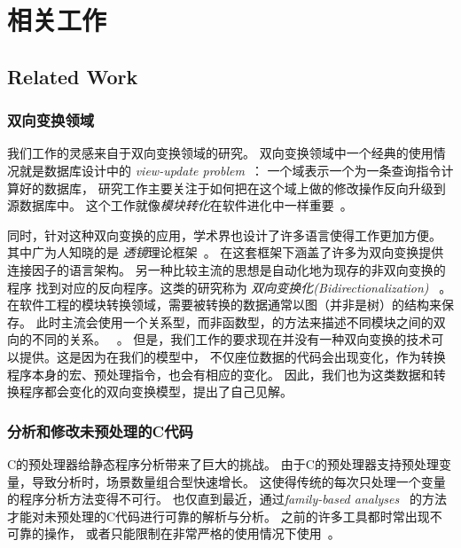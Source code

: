 \chapter{相关工作}
\section{Related Work}
\label{sec:related}

\subsection{双向变换领域}
我们工作的灵感来自于双向变换领域的研究。
双向变换领域中一个经典的使用情况就是数据库设计中的
\emph{view-update problem}~\parencite{BaSp81,DaBe82,Hegner90,Cui2000,Fegaras2010}：
一个域表示一个为一条查询指令计算好的数据库，
研究工作主要关注于如何把在这个域上做的修改操作反向升级到源数据库中。
这个工作就像\emph{模块转化}在软件进化中一样重要~\parencite{YuLHHKM12,XiLHZTM07}。

同时，针对这种双向变换的应用，学术界也设计了许多语言使得工作更加方便。
其中广为人知晓的是 \emph{透镜}理论框架~\parencite{HuMT04,MuHT04aplas,Foster:2007,BoFPPS08,FoPP08,WaGMH10,Diskin2011,Hofmann2012,FoMV12,RaLFC13}。
在这套框架下涵盖了许多为双向变换提供连接因子的语言架构。
另一种比较主流的思想是自动化地为现存的非双向变换的程序
找到对应的反向程序。这类的研究称为 \emph{双向变换化(Bidirectionalization)}
~\parencite{MaHNHT07,Voigtlander09bff,voigtlander2010combining,WaGW11,VoHMW13,WaGMH13,MaWa13,MaWa13ppdp,WaNa14,MaWa14}。
在软件工程的模块转换领域，需要被转换的数据通常以图（并非是树）的结构来保存。
此时主流会使用一个关系型，而非函数型，的方法来描述不同模块之间的双向的不同的关系。
~\parencite{qvt,Stevens2010,Schurr1994,Schurr2008,HiHIKMN10,Hidaka:2011}。
但是，我们工作的要求现在并没有一种双向变换的技术可以提供。这是因为在我们的模型中，
不仅座位数据的代码会出现变化，作为转换程序本身的宏、预处理指令，也会有相应的变化。
因此，我们也为这类数据和转换程序都会变化的双向变换模型，提出了自己见解。


\subsection{分析和修改未预处理的C代码}
C的预处理器给静态程序分析带来了巨大的挑战。
由于C的预处理器支持预处理变量，导致分析时，场景数量组合型快速增长。
这使得传统的每次只处理一个变量的程序分析方法变得不可行。
也仅直到最近，通过\emph{family-based
analyses}~\parencite{Kastner2011,Gazzillo2012,Liebig2013}
的方法才能对未预处理的C代码进行可靠的解析与分析。
之前的许多工具都时常出现不可靠的操作，
或者只能限制在非常严格的使用情况下使用~\parencite{Baxter2001,Garrido2005,Padioleau2009}。

